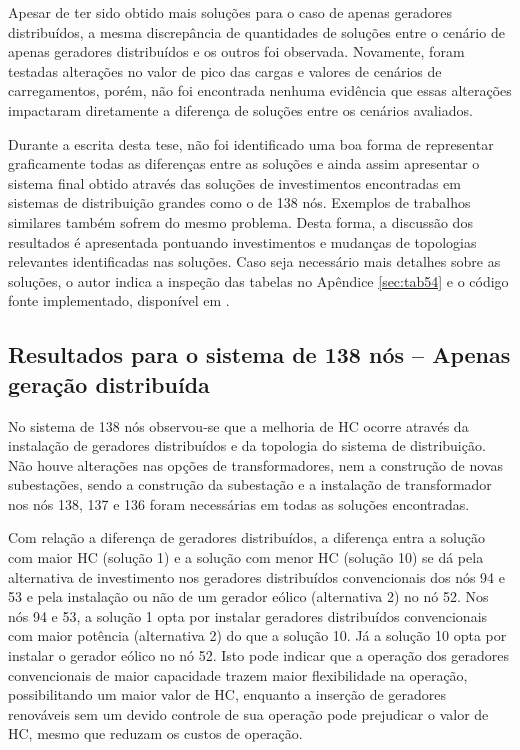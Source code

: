 Apesar de ter sido obtido mais soluções para o caso de apenas geradores distribuídos, a mesma discrepância de quantidades de soluções entre o cenário de apenas geradores distribuídos e os outros foi observada. Novamente, foram testadas alterações no valor de pico das cargas e valores de cenários de carregamentos, porém, não foi encontrada nenhuma evidência que essas alterações impactaram diretamente a diferença de soluções entre os cenários avaliados.

Durante a escrita desta tese, não foi identificado uma boa forma de representar graficamente todas as diferenças entre as soluções e ainda assim apresentar o sistema final obtido através das soluções de investimentos encontradas em sistemas de distribuição grandes como o de 138 nós. Exemplos de trabalhos similares também sofrem do mesmo problema. Desta forma, a discussão dos resultados é apresentada pontuando investimentos e mudanças de topologias relevantes identificadas nas soluções. Caso seja necessário mais detalhes sobre as soluções, o autor indica a inspeção das tabelas no Apêndice \ref{sec:tab54} e o código fonte implementado, disponível em \cite{modelocomHC}.

\subsection{Resultados para o sistema de 138 nós -- Apenas geração distribuída}

No sistema de 138 nós observou-se que a melhoria de \ac{HC} ocorre através da instalação de geradores distribuídos e da topologia do sistema de distribuição. Não houve alterações nas opções de transformadores, nem a construção de novas subestações, sendo a construção da subestação e a instalação de transformador nos nós 138, 137 e 136 foram necessárias em todas as soluções encontradas.

Com relação a diferença de geradores distribuídos, a diferença entra a solução com maior \ac{HC} (solução 1) e a solução com menor \ac{HC} (solução 10) se dá pela alternativa de investimento nos geradores distribuídos convencionais dos nós 94 e 53 e pela instalação ou não de um gerador eólico (alternativa 2) no nó 52. Nos nós 94 e 53, a solução 1 opta por instalar geradores distribuídos convencionais com maior potência (alternativa 2) do que a solução 10. Já a solução 10 opta por instalar o gerador eólico no nó 52. Isto pode indicar que a operação dos geradores convencionais de maior capacidade trazem maior flexibilidade na operação, possibilitando um maior valor de \ac{HC}, enquanto a inserção de geradores renováveis sem um devido controle de sua operação pode prejudicar o valor de \ac{HC}, mesmo que reduzam os custos de operação.


